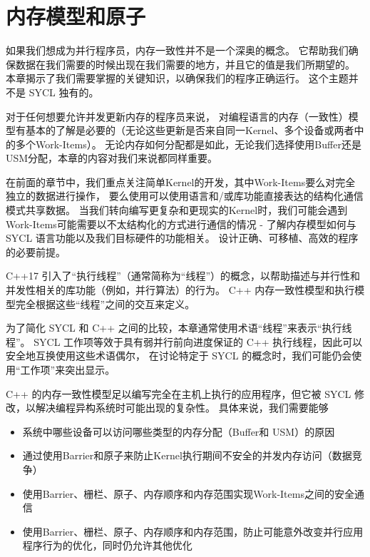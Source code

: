 \section{内存模型和原子}
如果我们想成为并行程序员，内存一致性并不是一个深奥的概念。 
它帮助我们确保数据在我们需要的时候出现在我们需要的地方，并且它的值是我们所期望的。 
本章揭示了我们需要掌握的关键知识，以确保我们的程序正确运行。 这个主题并不是 SYCL 独有的。

对于任何想要允许并发更新内存的程序员来说，
对编程语言的内存（一致性）模型有基本的了解是必要的（无论这些更新是否来自同一Kernel、多个设备或两者中的多个Work-Items）。 
无论内存如何分配都是如此，无论我们选择使用Buffer还是USM分配，本章的内容对我们来说都同样重要。

在前面的章节中，我们重点关注简单Kernel的开发，其中Work-Items要么对完全独立的数据进行操作，
要么使用可以使用语言和/或库功能直接表达的结构化通信模式共享数据。 
当我们转向编写更复杂和更现实的Kernel时，我们可能会遇到Work-Items可能需要以不太结构化的方式进行通信的情况 - 
了解内存模型如何与 SYCL 语言功能以及我们目标硬件的功能相关。 设计正确、可移植、高效的程序的必要前提。

\begin{remark}[执行线程]
C++17 引入了“执行线程”（通常简称为“线程”）的概念，以帮助描述与并行性和并发性相关的库功能（例如，并行算法）的行为。
C++ 内存一致性模型和执行模型完全根据这些“线程”之间的交互来定义。

为了简化 SYCL 和 C++ 之间的比较，本章通常使用术语“线程”来表示“执行线程”。
SYCL 工作项等效于具有弱并行前向进度保证的 C++ 执行线程，因此可以安全地互换使用这些术语偶尔，
在讨论特定于 SYCL 的概念时，我们可能仍会使用“工作项”来突出显示。
\end{remark}

C++ 的内存一致性模型足以编写完全在主机上执行的应用程序，但它被 SYCL 修改，以解决编程异构系统时可能出现的复杂性。 
具体来说，我们需要能够

\begin{itemize}
	\item 系统中哪些设备可以访问哪些类型的内存分配（Buffer和 USM）的原因

	\item 通过使用Barrier和原子来防止Kernel执行期间不安全的并发内存访问（数据竞争）

	\item 使用Barrier、栅栏、原子、内存顺序和内存范围实现Work-Items之间的安全通信

	\item 使用Barrier、栅栏、原子、内存顺序和内存范围，防止可能意外改变并行应用程序行为的优化，同时仍允许其他优化
\end{itemize}

